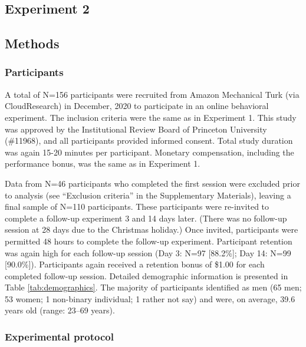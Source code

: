 \documentclass[a4paper,12pt]{article}
\begin{document}
\begin{refsection}[main]
\section*{Experiment 2}

\subsection*{Methods}

\subsubsection*{Participants}

A total of N=156 participants were recruited from Amazon Mechanical Turk (via CloudResearch) in December, 2020 to participate in an online behavioral experiment. The inclusion criteria were the same as in Experiment 1. This study was approved by the Institutional Review Board of Princeton University (\#11968), and all participants provided informed consent. Total study duration was again 15-20 minutes per participant. Monetary compensation, including the performance bonus, was the same as in Experiment 1. 

Data from N=46 participants who completed the first session were excluded prior to analysis (see ``Exclusion criteria'' in the Supplementary Materials), leaving a final sample of N=110 participants. These participants were re-invited to complete a follow-up experiment 3 and 14 days later. (There was no follow-up session at 28 days due to the Christmas holiday.) Once invited, participants were permitted 48 hours to complete the follow-up experiment. Participant retention was again high for each follow-up session (Day 3: N=97 [88.2\%]; Day 14: N=99 [90.0\%]). Participants again received a retention bonus of \$1.00 for each completed follow-up session. Detailed demographic information is presented in Table \ref{tab:demographics}. The majority of participants identified as men (65 men; 53 women; 1 non-binary individual; 1 rather not say) and were, on average, 39.6 years old (range: 23--69 years).

\subsubsection*{Experimental protocol}


\end{refsection}
\end{document}
